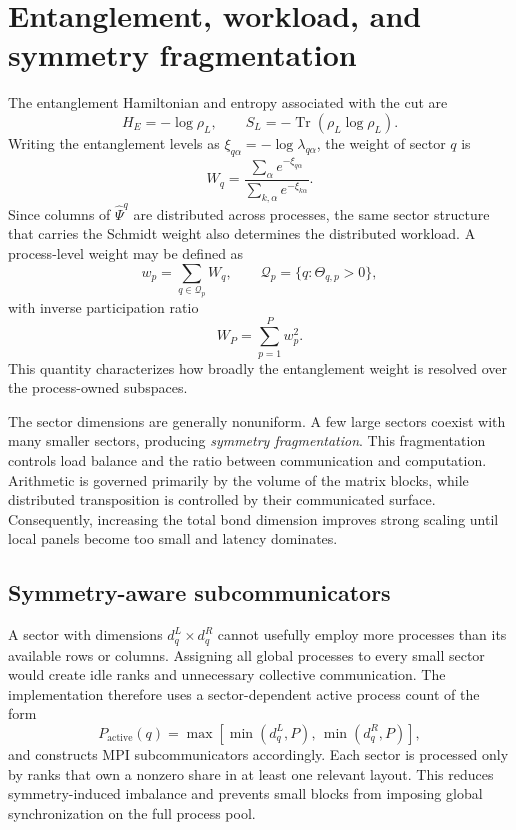 \documentclass[11pt,a4paper]{article}
\newcommand{\Tr}{\operatorname{Tr}}
\begin{document}
\section{Entanglement, workload, and symmetry fragmentation}

The entanglement Hamiltonian and entropy associated with the cut are
\begin{equation}
  H_E=-\log\rho_L,
  \qquad
  S_L=-\Tr(\rho_L\log\rho_L).
\end{equation}
Writing the entanglement levels as $\xi_{q\alpha}=-\log\lambda_{q\alpha}$,
the weight of sector $q$ is
\begin{equation}
  W_q=
  \frac{\sum_\alpha e^{-\xi_{q\alpha}}}
       {\sum_{k,\alpha}e^{-\xi_{k\alpha}}}.
\end{equation}
Since columns of $\widehat\Psi^q$ are distributed across processes, the same
sector structure that carries the Schmidt weight also determines the
distributed workload.  A process-level weight may be defined as
\begin{equation}
  w_p=\sum_{q\in\mathcal Q_p}W_q,
  \qquad
  \mathcal Q_p=\{q:\Theta_{q,p}>0\},
\end{equation}
with inverse participation ratio
\begin{equation}
  W_P=\sum_{p=1}^{P}w_p^2.
\end{equation}
This quantity characterizes how broadly the entanglement weight is resolved
over the process-owned subspaces.

The sector dimensions are generally nonuniform.  A few large sectors coexist
with many smaller sectors, producing \emph{symmetry fragmentation}.  This
fragmentation controls load balance and the ratio between communication and
computation.  Arithmetic is governed primarily by the volume of the matrix
blocks, while distributed transposition is controlled by their communicated
surface.  Consequently, increasing the total bond dimension improves strong
scaling until local panels become too small and latency dominates.

\subsection{Symmetry-aware subcommunicators}

A sector with dimensions $d_q^L\times d_q^R$ cannot usefully employ more
processes than its available rows or columns.  Assigning all global processes
to every small sector would create idle ranks and unnecessary collective
communication.  The implementation therefore uses a sector-dependent active
process count of the form
\begin{equation}
  P_{\mathrm{active}}(q)
  =\max\!\left[
    \min(d_q^L,P),\,
    \min(d_q^R,P)
  \right],
\end{equation}
and constructs MPI subcommunicators accordingly.  Each sector is processed
only by ranks that own a nonzero share in at least one relevant layout.  This
reduces symmetry-induced imbalance and prevents small blocks from imposing
global synchronization on the full process pool.
\end{document}
